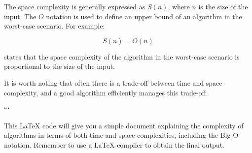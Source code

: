 The space complexity is generally expressed as $S(n)$, where $n$ is the size of the input. The $O$ notation is used to define an upper bound of an algorithm in the worst-case scenario. For example:

\begin{equation}
S(n) = O(n)
\end{equation}

states that the space complexity of the algorithm in the worst-case scenario is proportional to the size of the input.

It is worth noting that often there is a trade-off between time and space complexity, and a good algorithm efficiently manages this trade-off.


```

This LaTeX code will give you a simple document explaining the complexity of algorithms in terms of both time and space complexities, including the Big O notation. Remember to use a LaTeX compiler to obtain the final output.

